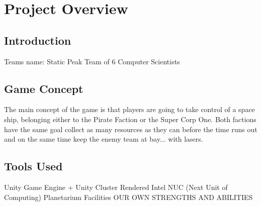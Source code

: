 \chapter{Project Overview}

\section{Introduction}
\markboth{\MakeUppercase{\thechapter}}
Teams name: Static Peak
Team of 6 Computer Scientists

\section{Game Concept}
\markboth{\MakeUppercase{\thechapter}}
The main concept of the game is that players are going to take control of a space ship, belonging either to the Pirate Faction or the Super Corp One. Both factions have the same goal collect as many resources as they can before the time runs out and on the same time keep the enemy team at bay... with lasers. 

\section{Tools Used}
\markboth{\MakeUppercase{\thechapter}}
Unity Game Engine + Unity Cluster Rendered
Intel NUC (Next Unit of Computing)
Planetarium Facilities
OUR OWN STRENGTHS AND ABILITIES


